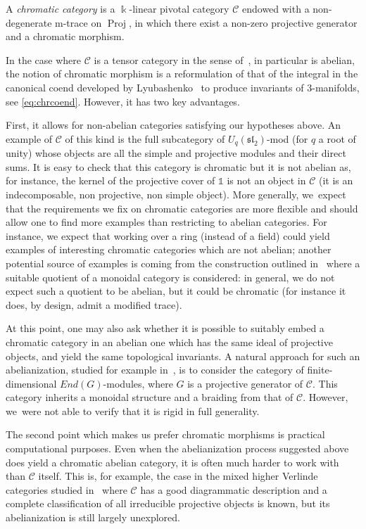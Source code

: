 \documentclass[10pt,a4paper]{amsart}
\numberwithin{equation}{section}
\newcommand{\Proj}{\operatorname{Proj}}
\numberwithin{theorem}{section}
\numberwithin{proposition}{section}
\numberwithin{definition}{section}
\numberwithin{lemma}{section}
\numberwithin{corollary}{section}
\numberwithin{remark}{section}
\numberwithin{example}{section}
\newcommand{\cat}{\mathcal{C}}
\newcommand{\unit}{\ensuremath{\mathds{1}}}
\newcommand{\FK}{{\Bbbk}}
\begin{document}
\begin{definition}%
 A \emph{chromatic
 category} is a $\FK$-linear pivotal category $\cat$ endowed with a
 non-degenerate m-trace on $\Proj$, in which there exist a non-zero
 projective generator and a chromatic morphism.
\end{definition}
\begin{remark}
In the case where $\cat$ is a tensor category in the sense of~\cite{EGNO}, in particular is abelian, the notion of chromatic morphism is a reformulation of that of the integral in the canonical coend developed by Lyubashenko~\cite{L94} to produce invariants of 3-manifolds, see \eqref{eq:chrcoend}. However, it has two key advantages.

First, it allows for non-abelian categories satisfying our hypotheses above.
An example of $\cat$ of this kind is the full subcategory of $U_q(\mathfrak{sl}_2)$-mod (for $q$ a root of unity) whose objects are all the simple and projective modules and their direct sums. It is easy to check that this category is chromatic but it is not abelian as, for instance, the kernel of the projective cover of $\unit$ is not an object in $\cat$ (it is an indecomposable, non projective, non simple object).
More generally,
we~expect that the requirements we fix on chromatic categories are
more flexible and should allow one to find more examples than
restricting to abelian categories. For instance, we expect that working
over a ring (instead of a field) could yield examples of interesting
chromatic categories which are not abelian; another potential source
of examples is coming from the construction outlined in~\cite[Theorem~4.2]{CGP22} where a suitable quotient of a monoidal category is
considered: in general, we do not expect such a quotient to be abelian,
but it could be chromatic (for instance it does, by design, admit a
modified trace).

At this point, one may also ask whether it is possible to suitably
embed a chromatic category in an abelian one which has the same ideal of projective objects, and yield the same topological invariants. A natural approach for such an abelianization, studied for example in~\cite{BEO23}, is to consider the category of finite-dimensional
$End(G)$-modules, where $G$ is a projective generator of $\cat$. This category inherits a monoidal structure and a braiding from that of $\cat$. However,
we~were not able to verify that it is rigid in full
generality.

The second point which makes us prefer chromatic morphisms is practical computational purposes. Even when the abelianization process suggested above does yield a chromatic abelian category, it is often much harder to work with than $\cat$ itself. This is, for example, the case in the mixed higher Verlinde categories studied in~\cite{Decoppet, DH2HB} where $\cat$ has a good diagrammatic description and a complete classification of all irreducible projective objects is known, but its abelianization is still largely unexplored.
\end{remark}
\end{document}
